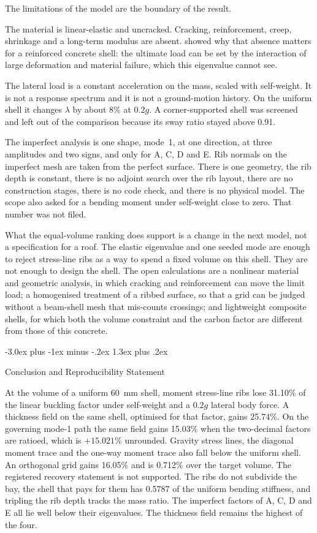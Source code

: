 \documentclass[11pt,a4paper]{article}
\makeatletter
\renewcommand\section{\@startsection{section}{1}{\z@}%
  {-3.0ex plus -1ex minus -.2ex}%
  {1.3ex plus .2ex}%
  {\normalfont\Large\bfseries\raggedright}}
\makeatother
\begin{document}
The limitations of the model are the boundary of the result.

The material is linear-elastic and uncracked.
Cracking, reinforcement, creep, shrinkage and a long-term modulus are absent.
\cite{ramm1991} showed why that absence matters for a reinforced concrete shell: the ultimate load can be set by the interaction of large deformation and material failure, which this eigenvalue cannot see.

The lateral load is a constant acceleration on the mass, scaled with self-weight.
It is not a response spectrum and it is not a ground-motion history.
On the uniform shell it changes \(\lambda\) by about 8\% at \(0.2g\).
A corner-supported shell was screened and left out of the comparison because its sway ratio stayed above 0.91.

The imperfect analysis is one shape, mode~1, at one direction, at three amplitudes and two signs, and only for A, C, D and E.
Rib normals on the imperfect mesh are taken from the perfect surface.
There is one geometry, the rib depth is constant, there is no adjoint search over the rib layout, there are no construction stages, there is no code check, and there is no physical model.
The scope also asked for a bending moment under self-weight close to zero.
That number was not filed.

What the equal-volume ranking does support is a change in the next model, not a specification for a roof.
The elastic eigenvalue and one seeded mode are enough to reject stress-line ribs as a way to spend a fixed volume on this shell.
They are not enough to design the shell.
The open calculations are a nonlinear material and geometric analysis, in which cracking and reinforcement can move the limit load; a homogenised treatment of a ribbed surface, so that a grid can be judged without a beam-shell mesh that mis-counts crossings; and lightweight composite shells, for which both the volume constraint and the carbon factor are different from those of this concrete.

\section{Conclusion and Reproducibility Statement}
\label{sec:conclusion}

At the volume of a uniform 60~mm shell, moment stress-line ribs lose 31.10\% of the linear buckling factor under self-weight and a \(0.2g\) lateral body force.
A thickness field on the same shell, optimised for that factor, gains 25.74\%.
On the governing mode-1 path the same field gains 15.03\% when the two-decimal factors are ratioed, which is \(+15.021\%\) unrounded.
Gravity stress lines, the diagonal moment trace and the one-way moment trace also fall below the uniform shell.
An orthogonal grid gains 16.05\% and is 0.712\% over the target volume.
The registered recovery statement is not supported.
The ribs do not subdivide the bay, the shell that pays for them has 0.5787 of the uniform bending stiffness, and tripling the rib depth tracks the mass ratio.
The imperfect factors of A, C, D and E all lie well below their eigenvalues.
The thickness field remains the highest of the four.
\end{document}
